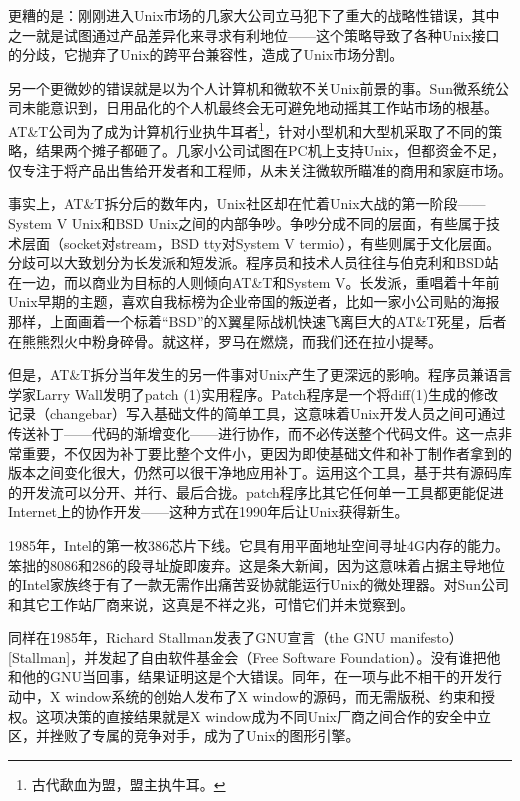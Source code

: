 \documentclass[11pt,oneside]{book}
\begin{document}
\begin{common-format}
更糟的是：刚刚进入Unix市场的几家大公司立马犯下了重大的战略性错误，其中之一就是试图通过产品差异化来寻求有利地位——这个策略导致了各种Unix接口的分歧，它抛弃了Unix的跨平台兼容性，造成了Unix市场分割。

另一个更微妙的错误就是以为个人计算机和微软不关Unix前景的事。Sun微系统公司未能意识到，日用品化的个人机最终会无可避免地动摇其工作站市场的根基。AT\&{}T公司为了成为计算机行业执牛耳者\footnote{古代歃血为盟，盟主执牛耳。}，针对小型机和大型机采取了不同的策略，结果两个摊子都砸了。几家小公司试图在PC机上支持Unix，但都资金不足，仅专注于将产品出售给开发者和工程师，从未关注微软所瞄准的商用和家庭市场。

事实上，AT\&{}T拆分后的数年内，Unix社区却在忙着Unix大战的第一阶段——System V Unix和BSD Unix之间的内部争吵。争吵分成不同的层面，有些属于技术层面（socket对stream，BSD tty对System V termio），有些则属于文化层面。分歧可以大致划分为长发派和短发派。程序员和技术人员往往与伯克利和BSD站在一边，而以商业为目标的人则倾向AT\&{}T和System V。长发派，重唱着十年前Unix早期的主题，喜欢自我标榜为企业帝国的叛逆者，比如一家小公司贴的海报那样，上面画着一个标着“BSD”的X翼星际战机快速飞离巨大的AT\&{}T死星，后者在熊熊烈火中粉身碎骨。就这样，罗马在燃烧，而我们还在拉小提琴。

但是，AT\&{}T拆分当年发生的另一件事对Unix产生了更深远的影响。程序员兼语言学家Larry Wall发明了patch (1)实用程序。Patch程序是一个将diff(1)生成的修改记录（changebar）写入基础文件的简单工具，这意味着Unix开发人员之间可通过传送补丁——代码的渐增变化——进行协作，而不必传送整个代码文件。这一点非常重要，不仅因为补丁要比整个文件小，更因为即使基础文件和补丁制作者拿到的版本之间变化很大，仍然可以很干净地应用补丁。运用这个工具，基于共有源码库的开发流可以分开、并行、最后合拢。patch程序比其它任何单一工具都更能促进Internet上的协作开发——这种方式在1990年后让Unix获得新生。

1985年，Intel的第一枚386芯片下线。它具有用平面地址空间寻址4G内存的能力。笨拙的8086和286的段寻址旋即废弃。这是条大新闻，因为这意味着占据主导地位的Intel家族终于有了一款无需作出痛苦妥协就能运行Unix的微处理器。对Sun公司和其它工作站厂商来说，这真是不祥之兆，可惜它们并未觉察到。

同样在1985年，Richard Stallman发表了GNU宣言（the GNU manifesto）[Stallman]，并发起了自由软件基金会（Free Software Foundation）。没有谁把他和他的GNU当回事，结果证明这是个大错误。同年，在一项与此不相干的开发行动中，X window系统的创始人发布了X window的源码，而无需版税、约束和授权。这项决策的直接结果就是X window成为不同Unix厂商之间合作的安全中立区，并挫败了专属的竞争对手，成为了Unix的图形引擎。


\end{common-format}
\end{document}
